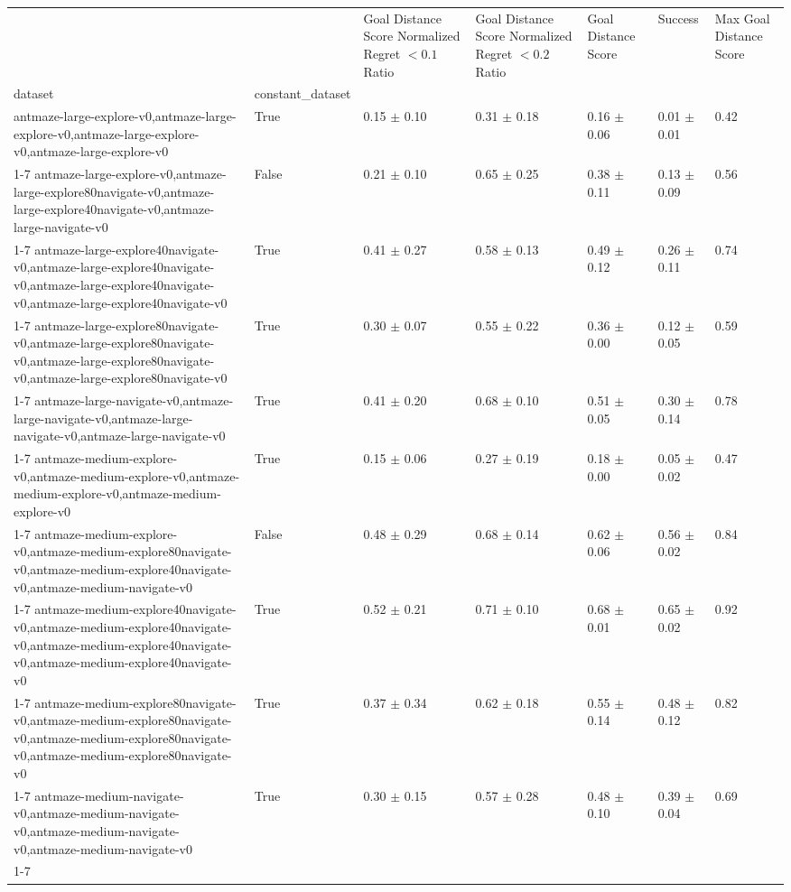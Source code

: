 \begin{tabular}{lllllll}
\toprule
 &  & Goal Distance Score Normalized Regret $< 0.1$ Ratio & Goal Distance Score Normalized Regret $< 0.2$ Ratio & Goal Distance Score & Success & Max Goal Distance Score \\
dataset & constant_dataset &  &  &  &  &  \\
\midrule
antmaze-large-explore-v0,antmaze-large-explore-v0,antmaze-large-explore-v0,antmaze-large-explore-v0 & True & 0.15 $\pm$ 0.10 & 0.31 $\pm$ 0.18 & 0.16 $\pm$ 0.06 & 0.01 $\pm$ 0.01 & 0.42 \\
\cline{1-7}
antmaze-large-explore-v0,antmaze-large-explore80navigate-v0,antmaze-large-explore40navigate-v0,antmaze-large-navigate-v0 & False & 0.21 $\pm$ 0.10 & 0.65 $\pm$ 0.25 & 0.38 $\pm$ 0.11 & 0.13 $\pm$ 0.09 & 0.56 \\
\cline{1-7}
antmaze-large-explore40navigate-v0,antmaze-large-explore40navigate-v0,antmaze-large-explore40navigate-v0,antmaze-large-explore40navigate-v0 & True & 0.41 $\pm$ 0.27 & 0.58 $\pm$ 0.13 & 0.49 $\pm$ 0.12 & 0.26 $\pm$ 0.11 & 0.74 \\
\cline{1-7}
antmaze-large-explore80navigate-v0,antmaze-large-explore80navigate-v0,antmaze-large-explore80navigate-v0,antmaze-large-explore80navigate-v0 & True & 0.30 $\pm$ 0.07 & 0.55 $\pm$ 0.22 & 0.36 $\pm$ 0.00 & 0.12 $\pm$ 0.05 & 0.59 \\
\cline{1-7}
antmaze-large-navigate-v0,antmaze-large-navigate-v0,antmaze-large-navigate-v0,antmaze-large-navigate-v0 & True & 0.41 $\pm$ 0.20 & 0.68 $\pm$ 0.10 & 0.51 $\pm$ 0.05 & 0.30 $\pm$ 0.14 & 0.78 \\
\cline{1-7}
antmaze-medium-explore-v0,antmaze-medium-explore-v0,antmaze-medium-explore-v0,antmaze-medium-explore-v0 & True & 0.15 $\pm$ 0.06 & 0.27 $\pm$ 0.19 & 0.18 $\pm$ 0.00 & 0.05 $\pm$ 0.02 & 0.47 \\
\cline{1-7}
antmaze-medium-explore-v0,antmaze-medium-explore80navigate-v0,antmaze-medium-explore40navigate-v0,antmaze-medium-navigate-v0 & False & 0.48 $\pm$ 0.29 & 0.68 $\pm$ 0.14 & 0.62 $\pm$ 0.06 & 0.56 $\pm$ 0.02 & 0.84 \\
\cline{1-7}
antmaze-medium-explore40navigate-v0,antmaze-medium-explore40navigate-v0,antmaze-medium-explore40navigate-v0,antmaze-medium-explore40navigate-v0 & True & 0.52 $\pm$ 0.21 & 0.71 $\pm$ 0.10 & 0.68 $\pm$ 0.01 & 0.65 $\pm$ 0.02 & 0.92 \\
\cline{1-7}
antmaze-medium-explore80navigate-v0,antmaze-medium-explore80navigate-v0,antmaze-medium-explore80navigate-v0,antmaze-medium-explore80navigate-v0 & True & 0.37 $\pm$ 0.34 & 0.62 $\pm$ 0.18 & 0.55 $\pm$ 0.14 & 0.48 $\pm$ 0.12 & 0.82 \\
\cline{1-7}
antmaze-medium-navigate-v0,antmaze-medium-navigate-v0,antmaze-medium-navigate-v0,antmaze-medium-navigate-v0 & True & 0.30 $\pm$ 0.15 & 0.57 $\pm$ 0.28 & 0.48 $\pm$ 0.10 & 0.39 $\pm$ 0.04 & 0.69 \\
\cline{1-7}
\bottomrule
\end{tabular}
